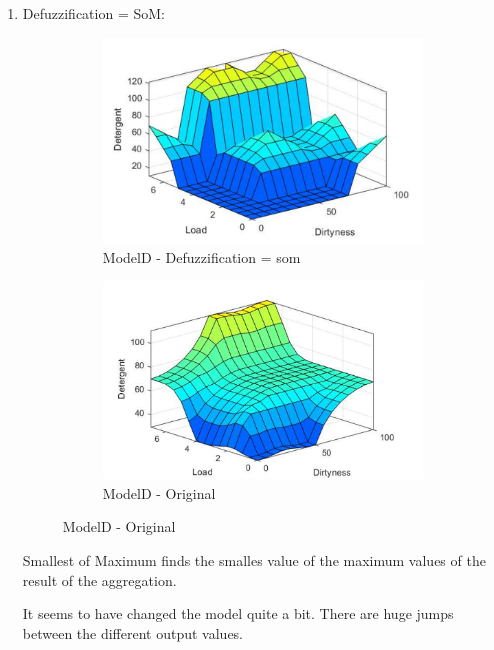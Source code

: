 \documentclass[11pt]{article}
\begin{document}
\begin{enumerate}[label=(\alph*)]
\begin{enumerate}[label=(\roman*)]
    \item Defuzziﬁcation = SoM:

    \begin{figure}[ht!]
    \centering
    \begin{subfigure}{.5\textwidth}
      \centering
      \includegraphics[width=.9\linewidth]{res/modelD_som}
      \caption{ModelD - Defuzziﬁcation = som}
      \label{fig:sub1}
    \end{subfigure}%
    \begin{subfigure}{.5\textwidth}
      \centering
      \includegraphics[width=.9\linewidth]{res/image2}
      \caption{ModelD - Original}
      \label{fig:sub2}
    \end{subfigure}
    \end{figure}

    Smallest of Maximum finds the smalles value of the maximum values of the
    result of the aggregation.

    It seems to have changed the model quite a bit. There are huge jumps
    between the different output values.

    \pagebreak


\end{enumerate}
\end{enumerate}
\end{document}
